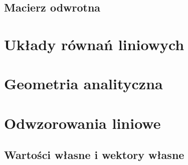 \documentclass[polish,pretty]{angav}
\begin{document}
        \subsection{Macierz odwrotna}
        

    \section{Układy równań liniowych}
    

    \section{Geometria analityczna}
    

    \section{Odwzorowania liniowe} \label{s:linear map}
    

        \subsection{Wartości własne i wektory własne}
        
\end{document}

